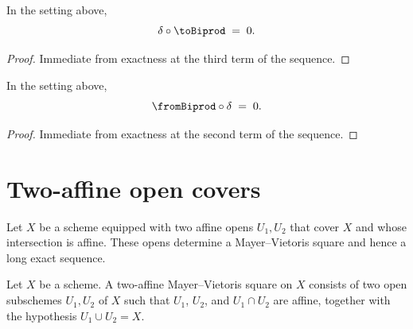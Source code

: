 \begin{lemma}\leanok
  \label{lem:Scheme_HModule_prime_delta_toBiprod}

  In the setting above,
  \[
    \delta \circ \toBiprod \;=\; 0.
  \]
\end{lemma}

\begin{proof}

  \leanok
  Immediate from exactness at the third term of the sequence.
\end{proof}

\begin{lemma}\leanok
  \label{lem:Scheme_HModule_prime_fromBiprod_delta}

  In the setting above,
  \[
    \fromBiprod \circ \delta \;=\; 0.
  \]
\end{lemma}

\begin{proof}

  \leanok
  Immediate from exactness at the second term of the sequence.
\end{proof}

\section{Two-affine open covers}
\label{sec:scheme_affineCoverMVSquare}

Let \(X\) be a scheme equipped with two affine opens \(U_1,U_2\) that cover \(X\) and whose intersection is affine. These opens determine a Mayer--Vietoris square and hence a long exact sequence.

\begin{definition}\leanok
  \label{def:Scheme_AffineCoverMVSquare}

  Let \(X\) be a scheme. A two-affine Mayer--Vietoris square on \(X\) consists of two open subschemes \(U_1, U_2\) of \(X\) such that \(U_1\), \(U_2\), and \(U_1 \cap U_2\) are affine, together with the hypothesis \(U_1 \cup U_2 = X\).
\end{definition}

